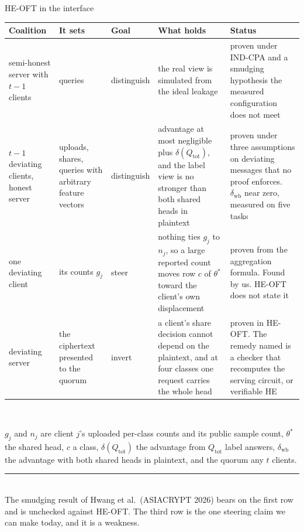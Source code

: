 \documentclass[aspectratio=169,10pt]{beamer}
\newcommand{\redline}{\textcolor{kred}{\rule{\textwidth}{1pt}}}
\newcommand{\Qtot}{Q_{\mathrm{tot}}}
\begin{document}
\begin{frame}{HE-OFT in the interface}
  \begin{center}
  \scriptsize
  \renewcommand{\arraystretch}{1.0}
  \begin{tabular}{@{}p{2.3cm}p{1.9cm}p{1.2cm}p{3.9cm}p{3.4cm}@{}}
    \toprule
    Coalition & It sets & Goal & What holds & Status\\
    \midrule
    semi-honest server with $t-1$ clients & queries & distinguish & the real view is simulated from the ideal leakage & proven under IND-CPA and a smudging hypothesis the measured configuration does not meet\\
    $t-1$ deviating clients, honest server & uploads, shares, queries with arbitrary feature vectors & distinguish & advantage at most negligible plus $\delta(\Qtot)$, and the label view is no stronger than both shared heads in plaintext & proven under three assumptions on deviating messages that no proof enforces. $\delta_{\mathrm{wb}}$ near zero, measured on five tasks\\
    one deviating client & its counts $g_j$ & steer & nothing ties $g_j$ to $n_j$, so a large reported count moves row $c$ of $\theta^{*}$ toward the client's own displacement & proven from the aggregation formula. Found by us. HE-OFT does not state it\\
    deviating server & the ciphertext presented to the quorum & invert & a client's share decision cannot depend on the plaintext, and at four classes one request carries the whole head & proven in HE-OFT. The remedy named is a checker that recomputes the serving circuit, or verifiable HE\\
    \bottomrule
  \end{tabular}\\[0.3em]
  \scriptsize\begin{minipage}{0.95\textwidth}
  $g_j$ and $n_j$ are client $j$'s uploaded per-class counts and its public sample count, $\theta^{*}$ the shared head, $c$ a class, $\delta(\Qtot)$ the advantage from $\Qtot$ label answers, $\delta_{\mathrm{wb}}$ the advantage with both shared heads in plaintext, and the quorum any $t$ clients.
  \end{minipage}
  \end{center}
  \vspace{0.2em}
  \redline\\[0.3em]
  \small The smudging result of Hwang et al.\ (ASIACRYPT 2026) bears on the first row and is unchecked against HE-OFT. The third row is the one steering claim we can make today, and it is a weakness.
\end{frame}
\end{document}

